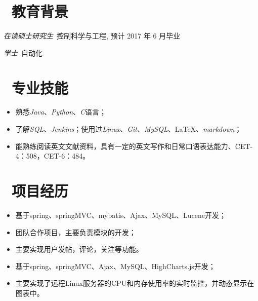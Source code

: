 \documentclass{resume}
\begin{document}



\section{\faGraduationCap\  教育背景}
\textit{在读硕士研究生}\ 控制科学与工程, 预计 2017 年 6 月毕业

\textit{学士}\ 自动化


\section{\faCogs\ 专业技能}
\begin{itemize}[parsep=1ex]
  \item 熟悉\emph{Java}、\emph{Python}、\emph{C}语言；
  \item 了解\emph{SQL}、\emph{Jenkins}；使用过\emph{Linux}、\emph{Git}、\emph{MySQL}、\LaTeX 、\emph{markdown}；
  \item 能熟练阅读英文文献资料，具有一定的英文写作和日常口语表达能力、CET-4：508，CET-6：484。
\end{itemize}

\section{\faUsers\ 项目经历}
\begin{itemize}
\item 基于spring、springMVC、mybatis、Ajax、MySQL、Lucene开发；
\item 团队合作项目，主要负责模块的开发；
\item 主要实现用户发帖，评论，关注等功能。
\end{itemize}
\begin{itemize}
\item 基于spring、springMVC、Ajax、MySQL、HighCharts.js开发；
\item 主要实现了远程Linux服务器的CPU和内存使用率的实时监控，并动态显示在图表中。
\end{itemize}
\end{document}
